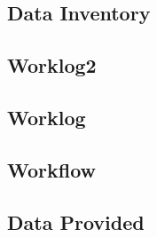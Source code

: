 \documentclass{article}
\begin{document}
\subsection*{Data Inventory}\label{datinv}
\subsection*{Worklog2}\label{mac2}


\subsection*{Worklog}\label{mac3}

\subsection*{Workflow}\label{workflow}

\subsection*{Data Provided}\label{dataprov}
\end{document}
